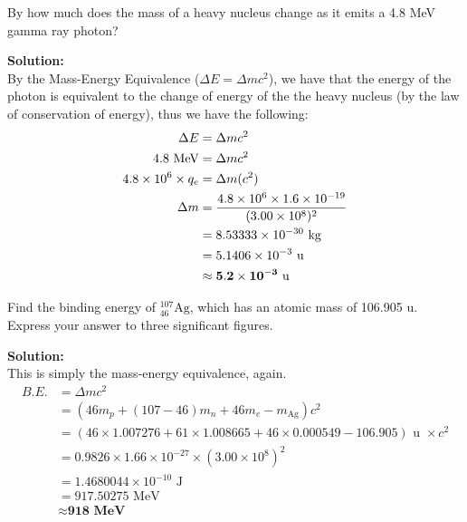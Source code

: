 \documentclass[a4paper, 12pt, addpoints]{exam}
\begin{document}
\begin{questions}
\question By how much does the mass of a heavy nucleus change as it emits a 4.8 MeV gamma ray photon?
\begin{tcolorbox}
\textbf{Solution:}
\\ By the Mass-Energy Equivalence ($\Delta E = \Delta mc^2$), we have that the energy of the photon is equivalent to the change of energy of the the heavy nucleus (by the law of conservation of energy), thus we have the following:
\begin{align*}
\Delta E &= \Delta mc^2 \\
4.8\text{ MeV} &= \Delta mc^2 \\
4.8 \times 10^6 \times q_e &= \Delta m (c^2) \\
\Delta m &= \frac{4.8 \times 10^6 \times 1.6 \times 10^{-19}}{(3.00\times 10^8)^2} \\
&= 8.53333 \times 10^{-30} \text{ kg} \\
&= 5.1406 \times 10^{-3} \text{ u} \\
&\approx \bf{5.2 \times 10^{-3}} \text{ u}
\end{align*}
\end{tcolorbox}

\question Find the binding energy of ${}^{107}_{46}\text{Ag}$, which has an atomic mass of 106.905 u. Express your answer to three significant figures.
\begin{tcolorbox}
\textbf{Solution: } \\
This is simply the mass-energy equivalence, again.
\begin{align*}
B.E. &= \Delta mc^2 \\
&= (46m_p + (107-46)m_n + 46m_e - m_{\text{Ag}}) c^2 \\
&= (46\times1.007276 + 61\times 1.008665 + 46 \times 0.000549 - 106.905)\text{ u }\times c^2 \\ 
&= 0.9826 \times 1.66 \times 10^{-27} \times (3.00\times 10^8)^2 \\
&= 1.4680044 \times 10^{-10}\text{ J}\\
&= 917.50275\text{ MeV} \\
&\approx \textbf{918 MeV}
\end{align*}
\end{tcolorbox}


\end{questions}
\end{document}
